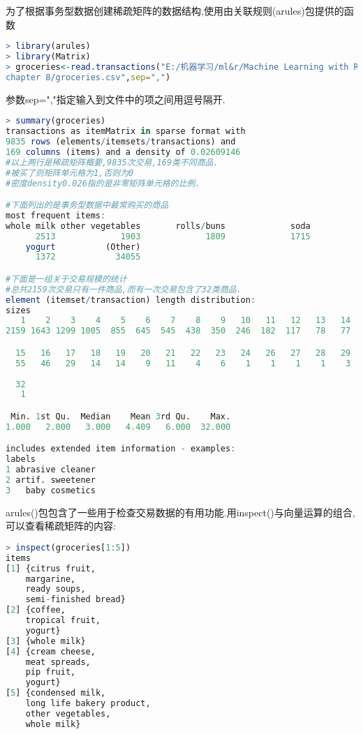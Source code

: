 \documentclass[11pt,a4paper,oneside]{book}
\begin{document}
为了根据事务型数据创建稀疏矩阵的数据结构,使用由关联规则(arules)包提供的函数
\begin{lstlisting}[language=r]
> library(arules)
> library(Matrix)
> groceries<-read.transactions("E:/机器学习/ml&r/Machine Learning with R/
chapter 8/groceries.csv",sep=",")
\end{lstlisting}
\begin{tcolorbox}[colback=pink!10!white,colframe=pink!100!black]
参数sep=","指定输入到文件中的项之间用逗号隔开.
\end{tcolorbox}
\begin{lstlisting}[language=r]
> summary(groceries)
transactions as itemMatrix in sparse format with
9835 rows (elements/itemsets/transactions) and
169 columns (items) and a density of 0.02609146 
#以上两行是稀疏矩阵概要,9835次交易,169类不同商品.
#被买了则矩阵单元格为1,否则为0
#密度density0.026指的是非零矩阵单元格的比例.

#下面列出的是事务型数据中最常购买的商品
most frequent items:
whole milk other vegetables       rolls/buns             soda 
      2513             1903             1809             1715 
    yogurt          (Other) 
      1372            34055 

#下面是一组关于交易规模的统计
#总共2159次交易只有一件商品,而有一次交易包含了32类商品.
element (itemset/transaction) length distribution:
sizes
   1    2    3    4    5    6    7    8    9   10   11   12   13   14 
2159 1643 1299 1005  855  645  545  438  350  246  182  117   78   77 

  15   16   17   18   19   20   21   22   23   24   26   27   28   29 
  55   46   29   14   14    9   11    4    6    1    1    1    1    3 
 
  32 
   1 

 Min. 1st Qu.  Median    Mean 3rd Qu.    Max. 
1.000   2.000   3.000   4.409   6.000  32.000 

includes extended item information - examples:
labels
1 abrasive cleaner
2 artif. sweetener
3   baby cosmetics
\end{lstlisting}

arules()包包含了一些用于检查交易数据的有用功能.用inspect()与向量运算的组合,可以查看稀疏矩阵的内容:
\begin{lstlisting}[language=r]
> inspect(groceries[1:5])
items                     
[1] {citrus fruit,            
	margarine,               
	ready soups,             
	semi-finished bread}     
[2] {coffee,                  
	tropical fruit,          
	yogurt}                  
[3] {whole milk}              
[4] {cream cheese,            
	meat spreads,            
	pip fruit,               
	yogurt}                  
[5] {condensed milk,          
	long life bakery product,
	other vegetables,        
	whole milk}  
\end{lstlisting}
\end{document}
